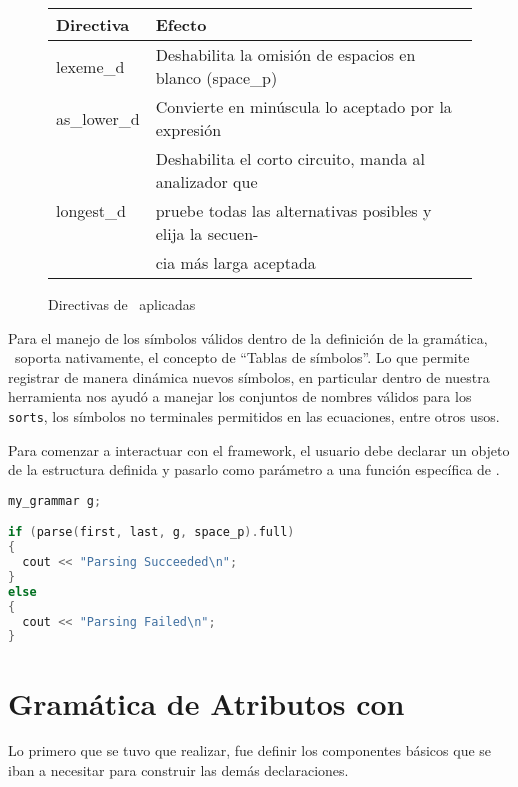 \begin{figure}[h!]\centering\scriptsize
\begin{tabular}{| l | p{7cm} |}
\hline

\rowcolor{gris} \textbf{Directiva} & \textbf{Efecto} \\ \hline

lexeme\_d    & Deshabilita la omisión de espacios en blanco (space\_p)\\ \hline
as\_lower\_d & Convierte en minúscula lo aceptado por la expresión\\ \hline
\multirow{3}{*}{longest\_d} & Deshabilita el corto circuito, manda al analizador que\\
                            & pruebe todas las alternativas posibles y elija la secuen-\\
                            & cia más larga aceptada \\ \hline
\end{tabular}
\caption{\label{directivas} Directivas de \spirit\ aplicadas}
\end{figure}

Para el manejo de los símbolos válidos dentro de la definición de la gramática, \spirit\ soporta nativamente, el concepto de ``Tablas de símbolos''. Lo que permite registrar de manera dinámica nuevos símbolos, en particular dentro de nuestra herramienta nos ayudó a manejar los conjuntos de nombres válidos para los \texttt{sorts}, los símbolos no terminales permitidos en las ecuaciones, entre otros usos.

Para comenzar a interactuar con el framework, el usuario debe declarar un objeto de la estructura definida y pasarlo como parámetro a una función específica de \spirit.

\begin{lstlisting}[float=t!, language=C++, basicstyle=\scriptsize, columns=fullflexible, linewidth=6cm]
my_grammar g;

if (parse(first, last, g, space_p).full)
{
  cout << "Parsing Succeeded\n";
}
else
{
  cout << "Parsing Failed\n";
}
\end{lstlisting}


\section{Gramática de Atributos con \spirit}
\label{sec:gramspirit}
Lo primero que se tuvo que realizar, fue definir los componentes básicos que se iban a necesitar para construir las demás declaraciones.

